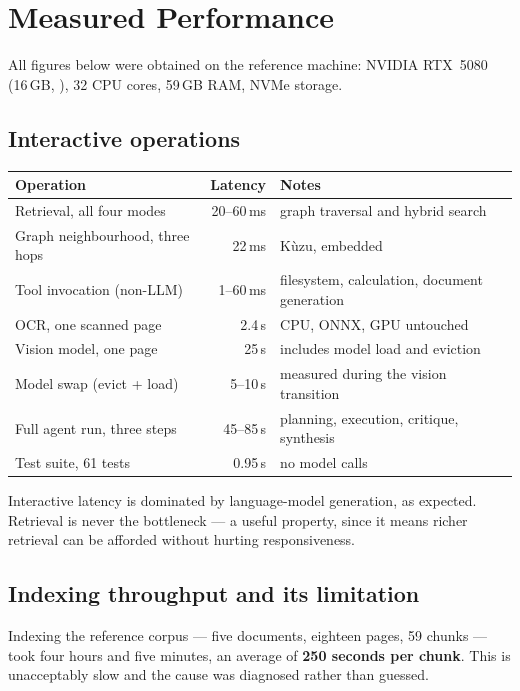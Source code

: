 \section{Measured Performance}

All figures below were obtained on the reference machine: NVIDIA RTX~5080
(16\,GB, ), 32 CPU cores, 59\,GB RAM, NVMe storage.

\subsection{Interactive operations}

\begin{center}
\renewcommand{\arraystretch}{1.25}
\begin{tabularx}{\linewidth}{@{}X r l@{}}
\toprule
\textbf{Operation} & \textbf{Latency} & \textbf{Notes} \\
\midrule
Retrieval, all four modes & 20--60\,ms & graph traversal and hybrid search \\
Graph neighbourhood, three hops & 22\,ms & K\`uzu, embedded \\
Tool invocation (non-LLM) & 1--60\,ms & filesystem, calculation, document generation \\
OCR, one scanned page & 2.4\,s & CPU, ONNX, GPU untouched \\
Vision model, one page & 25\,s & includes model load and eviction \\
Model swap (evict + load) & 5--10\,s & measured during the vision transition \\
Full agent run, three steps & 45--85\,s & planning, execution, critique, synthesis \\
Test suite, 61 tests & 0.95\,s & no model calls \\
\bottomrule
\end{tabularx}
\end{center}

\noindent Interactive latency is dominated by language-model generation, as
expected. Retrieval is never the bottleneck --- a useful property, since it
means richer retrieval can be afforded without hurting responsiveness.

\subsection{Indexing throughput and its limitation}

Indexing the reference corpus --- five documents, eighteen pages, 59 chunks ---
took four hours and five minutes, an average of \textbf{250 seconds per chunk}.
This is unacceptably slow and the cause was diagnosed rather than guessed.

